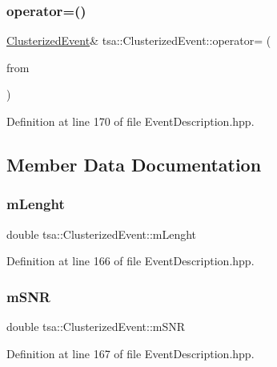\subsubsection{\texorpdfstring{operator=()}{operator=()}}
{\footnotesize\ttfamily \hyperlink{classtsa_1_1_clusterized_event}{Clusterized\+Event}\& tsa\+::\+Clusterized\+Event\+::operator= (\begin{DoxyParamCaption}\item[{const \hyperlink{classtsa_1_1_clusterized_event}{Clusterized\+Event} \&}]{from }\end{DoxyParamCaption})\hspace{0.3cm}{\ttfamily [inline]}}



Definition at line 170 of file Event\+Description.\+hpp.



\subsection{Member Data Documentation}
\mbox{\label{classtsa_1_1_clusterized_event_a77dc00c177e894b502969f2bd486c2bf}} 
\subsubsection{\texorpdfstring{m\+Lenght}{mLenght}}
{\footnotesize\ttfamily double tsa\+::\+Clusterized\+Event\+::m\+Lenght}



Definition at line 166 of file Event\+Description.\+hpp.

\mbox{\label{classtsa_1_1_clusterized_event_a76c2c0a996c70761b5ff0c1ca5c13293}} 
\subsubsection{\texorpdfstring{m\+S\+NR}{mSNR}}
{\footnotesize\ttfamily double tsa\+::\+Clusterized\+Event\+::m\+S\+NR}



Definition at line 167 of file Event\+Description.\+hpp.

